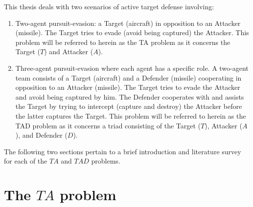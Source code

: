 % 
%
%
%

This thesis deals with two scenarios of active target defense involving:
\begin{enumerate}
	\item Two-agent pursuit-evasion: a Target (aircraft) in opposition to an Attacker (missile). The Target tries to evade (avoid being captured) the Attacker. This problem will be referred to herein as the TA problem as it concerns the Target ($T$) and Attacker ($A$).
	\item Three-agent pursuit-evasion where each agent has a specific role.
	A two-agent team consists of a Target (aircraft) and a Defender (missile) cooperating in opposition to an Attacker (missile).
	The Target tries to evade the Attacker and avoid being captured by him.
	The Defender cooperates with and assists the Target by trying to intercept (capture and destroy) the Attacker before the latter captures the Target.
	This problem will be referred to herein as the TAD problem as it concerns a triad consisting of the Target ($T$), Attacker ($A$), and Defender ($D$).
\end{enumerate}


The following two sections pertain to a brief introduction and literature survey for each of the $ TA $ and $ TAD $ problems.

\section{The $ TA $ problem}



